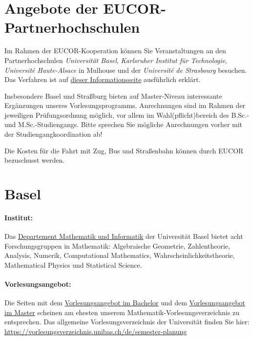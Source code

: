 \documentclass[a4paper,10pt]{article}
\begin{document}
\newpage
\section*{Angebote der EUCOR-Partnerhochschulen}

Im Rahmen der EUCOR-Kooperation können Sie Veranstaltungen an den Partnerhochschulen
\emph{Universität Basel}, \emph{Karlsruher Institut für Technologie},
\emph{Universit\'e Haute-Alsace} in Mulhouse und der \emph{Universit\'e de Strasbourg} besuchen. 
Das Verfahren ist auf 
\href{https://www.studium.uni-freiburg.de/de/beratung/austausch/eucor/outgoings-fuer-studierende-der-uni-freiburg}%
{dieser Informationsseite} ausführlich erklärt.

Insbesondere Basel und Straßburg bieten auf Master-Niveau interessante Ergänzungen unseres Vorlesungsprogramms. Anrechnungen sind im Rahmen der jeweiligen Prüfungsordnung möglich,
vor allem im Wahl(pflicht)bereich des B.Sc.- und M.Sc.-Studiengangs.
Bitte sprechen Sie mögliche Anrechnungen vorher mit der Studiengangkoordination ab!

Die Kosten für die Fahrt mit Zug, Bus und Straßenbahn können durch EUCOR bezuschusst werden.


\section*{Basel}

\paragraph{Institut:} Das \href{https://dmi.unibas.ch/de/forschung/mathematik/}{Departement Mathematik und Informatik}
der Universität Basel bietet acht Forschungsgruppen in Mathematik:
Algebraische Geometrie, Zahlentheorie, Analysis, Numerik, Computational Mathematics,
Wahrscheinlichkeitstheorie, Mathematical Physics und Statistical Science.

\paragraph{Vorlesungsangebot:} Die Seiten mit dem 
\href{https://dmi.unibas.ch/de/studium/mathematik/bachelor/lehrveranstaltungen-274/}{Vorlesungsangebot im Bachelor} 
und dem 
\href{https://dmi.unibas.ch/de/studium/mathematik/master/lehrveranstaltungen}{Vorlesungsangebot im Master}
scheinen am ehesten unserem Mathematik-Vorlesungsverzeichnis zu entsprechen. 
Das allgemeine Vorlesungsverzeichnis der Universität finden Sie hier:
\url{https://vorlesungsverzeichnis.unibas.ch/de/semester-planung}
\end{document}
